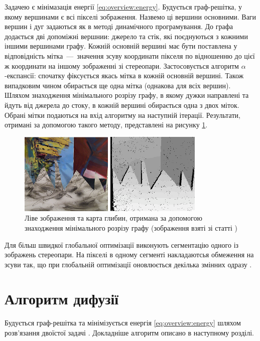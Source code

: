 Задачею є мінімазація енергії \ref{eq:overview:energy}.
Будується граф-решітка, у якому вершинами є всі пікселі зображення.
Назвемо ці вершини основними.
Ваги вершин і дуг задаються як в методі динамічного програмування.
До графа додається дві допоміжні вершнии: джерело та стік,
які поєднуються з кожними іншими вершинами графу.
Кожній основній вершині має бути поставлена у відповідність
мітка~---~значення зсуву координати пікселя по відношенню до цієї ж координати
на іншому зображенні зі стереопари.
Застосовується алгоритм $\alpha$-експансії:
спочатку фіксується якась мітка в кожній основній вершині.
Також випадковим чином обирається ще одна мітка (однакова для всіх вершин).
Шляхом знаходження мінімального розрізу графу,
в якому дужки направлені та йдуть від джерела до стоку,
в кожній вершині обирається одна з двох міток.
Обрані мітки подаються на вхід алгоритму на наступній ітерації.
Результати, отримані за допомогою такого методу,
представлені на рисунку \ref{fig:overview:kolmogorov:graphcut}.

\begin{figure}[h]
  \centering
  \includegraphics[width=0.8\textwidth]{images/overview_kolmogorov_graphcut}
  \caption{Ліве зображення та карта глибин,
           отримана за допомогою знаходження мінімального розрізу графу
           (зображення взяті зі статті \cite{overview:kolmogorov:graphcut})}
  \label{fig:overview:kolmogorov:graphcut}
\end{figure}

Для більш швидкої глобальної оптимізації
виконують сегментацію одного із зображень стереопари.
На пікселі в одному сегменті накладаютсья обмеження на зсуви так,
що при глобальній оптимізації оновлюється декілька змінних одразу
\cite{overview:ferg:graphcut}.

\section{Алгоритм дифузії}

Будується граф-решітка та мінімізується енергія \ref{eq:overview:energy}
шляхом розв'язання двоїстої задачі \cite{overview:savchynskyy:diffusion}.
Докладніше алгоритм описано в наступному розділі.

